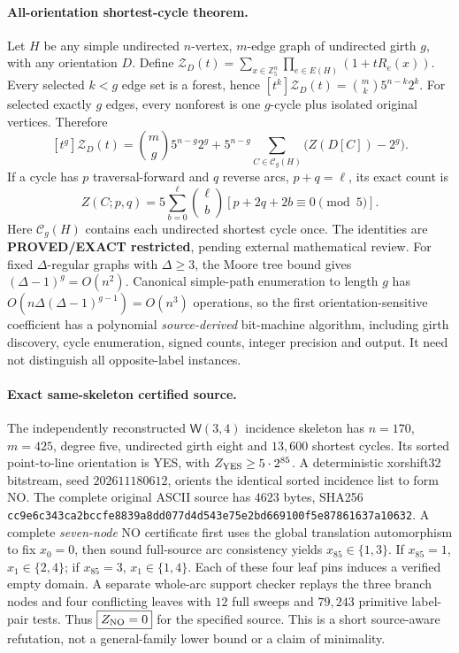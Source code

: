 \documentclass[11pt]{article}
\begin{document}
\paragraph{All-orientation shortest-cycle theorem.}
Let $H$ be any simple undirected $n$-vertex, $m$-edge graph of
undirected girth $g$, with any orientation $D$. Define
$\mathcal Z_D(t)=\sum_{x\in\mathbb Z_5^n}\prod_{e\in E(H)}
(1+tR_e(x))$. Every selected $k<g$ edge set is a forest, hence
$[t^k]\mathcal Z_D(t)=\binom mk5^{n-k}2^k$.
For selected exactly $g$ edges, every nonforest is one
$g$-cycle plus isolated original vertices. Therefore
\[
\boxed{
[t^g]\mathcal Z_D(t)=
\binom mg5^{n-g}2^g+
5^{n-g}\sum_{C\in\mathcal C_g(H)}
\bigl(Z(D[C])-2^g\bigr).
}
\]
If a cycle has $p$ traversal-forward and $q$ reverse arcs,
$p+q=\ell$, its exact count is
\[
Z(C;p,q)=5\sum_{b=0}^{\ell}\binom{\ell}{b}
[p+2q+2b\equiv0\pmod5].
\]
Here $\mathcal C_g(H)$ contains each undirected shortest cycle
once. The identities are \textbf{PROVED/EXACT restricted},
pending external mathematical review.
For fixed $\Delta$-regular graphs with $\Delta\ge3$,
the Moore tree bound gives $(\Delta-1)^g=O(n^2)$.
Canonical simple-path enumeration to length $g$ has
$O(n\Delta(\Delta-1)^{g-1})=O(n^3)$ operations, so the
first orientation-sensitive coefficient has a polynomial
\emph{source-derived} bit-machine algorithm, including girth
discovery, cycle enumeration, signed counts, integer precision
and output. It need not distinguish all opposite-label instances.

\paragraph{Exact same-skeleton certified source.}
The independently reconstructed $\mathsf W(3,4)$ incidence
skeleton has $n=170$, $m=425$, degree five, undirected
girth eight and $13{,}600$ shortest cycles. Its sorted
point-to-line orientation is YES, with
$Z_{\rm YES}\ge5\cdot2^{85}$. A deterministic
xorshift32 bitstream, seed $202611180612$, orients
the identical sorted incidence list to form NO.
The complete original ASCII source has $4623$ bytes,
SHA256
\texttt{cc9e6c343ca2bccfe8839a8dd077d4d543e75e2bd669100f5e87861637a10632}.
A complete \emph{seven-node} NO certificate first
uses the global translation automorphism to fix $x_0=0$,
then sound full-source arc consistency yields
$x_{85}\in\{1,3\}$. If $x_{85}=1$,
$x_1\in\{2,4\}$; if $x_{85}=3$,
$x_1\in\{1,4\}$. Each of these four leaf pins
induces a verified empty domain. A separate whole-arc
support checker replays the three branch nodes and
four conflicting leaves with $12$ full sweeps and
$79{,}243$ primitive label-pair tests. Thus
$\boxed{Z_{\rm NO}=0}$ for the specified source.
This is a short source-aware refutation, not a
general-family lower bound or a claim of minimality.
\end{document}
